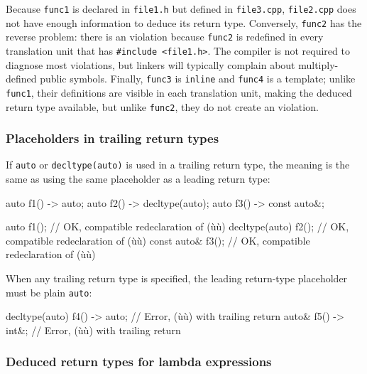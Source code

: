 \noindent Because \lstinline!func1! is declared in \lstinline!file1.h! but defined in
\lstinline!file3.cpp!, \lstinline!file2.cpp! does not have enough information
to deduce its return type. Conversely, \lstinline!func2! has the reverse
problem: there is an  violation because \lstinline!func2! is
redefined in every translation unit that has
\lstinline!#include!~\lstinline!<file1.h>!. The compiler is not required to
diagnose most  violations, but linkers will typically
complain about multiply-defined public symbols. Finally, \lstinline!func3!
is \lstinline!inline! and \lstinline!func4! is a template; unlike
\lstinline!func1!, their definitions are visible in each translation unit,
making the deduced return type available, but unlike \lstinline!func2!,
they do not create an  violation.

\subsubsection[Placeholders in trailing return types]{Placeholders in trailing return types}\label{placeholders-in-trailing-return-types}

If \lstinline!auto! or \lstinline!decltype(auto)! is used in a trailing return
type, the meaning is the same as using the same placeholder as a leading
return type:

\begin{emcppslisting}[emcppsstandards={c++14}]
auto f1() -> auto;
auto f2() -> decltype(auto);
auto f3() -> const auto&;

auto           f1();  // OK, compatible redeclaration of (ù{}ù)
decltype(auto) f2();  // OK, compatible redeclaration of (ù{}ù)
const auto&    f3();  // OK, compatible redeclaration of (ù{}ù)
\end{emcppslisting}
    

\noindent When any trailing return type is specified, the leading return-type
placeholder must be plain \lstinline!auto!:

\begin{emcppslisting}[emcppsstandards={c++14}]
decltype(auto) f4() -> auto;  // Error, (ù{}ù) with trailing return
auto&          f5() -> int&;  // Error, (ù{}ù) with trailing return
\end{emcppslisting}
    

\subsubsection[Deduced return types for lambda expressions]{Deduced return types for lambda expressions}\label{deduced-return-types-for-lambda-expressions}

